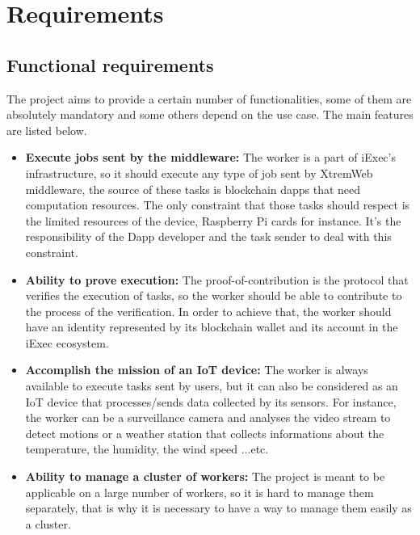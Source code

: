         \clearpage

\section{Requirements}
    \subsection{Functional requirements}
        The project aims to provide a certain number of functionalities, some of them are absolutely mandatory
        and some others depend on the use case. The main features are listed below.
        \begin{itemize}
            \item \textbf{Execute jobs sent by the middleware:} The worker is a part of iExec's infrastructure, so it
            should execute any type of job sent by XtremWeb middleware, the source of these tasks is blockchain
            dapps that need computation resources. The only constraint that those tasks should respect is the
            limited resources of the device, Raspberry Pi cards for instance. It's the responsibility of
            the Dapp developer and the task sender to deal with this constraint.

            \item \textbf{Ability to prove execution:} The proof-of-contribution\cite{POCO} is the protocol that
            verifies the execution of tasks, so the worker should be able to contribute to the process of the
            verification. In order to achieve that, the worker should have an identity represented by its
            blockchain wallet and its account in the iExec ecosystem.

            \item \textbf{Accomplish the mission of an IoT device:} The worker is always available to execute tasks sent by
            users, but it can also be considered as an IoT device that processes/sends data collected by its sensors.
            For instance, the worker can be a surveillance camera and analyses the video stream to detect motions or
            a weather station that collects informations about the temperature, the humidity, the wind speed ...etc.

            \item \textbf{Ability to manage a cluster of workers:} The project is meant to be applicable on a large number of
            workers, so it is hard to manage them separately, that is why it is necessary to have a way to manage them
            easily as a cluster.
        \end{itemize}


